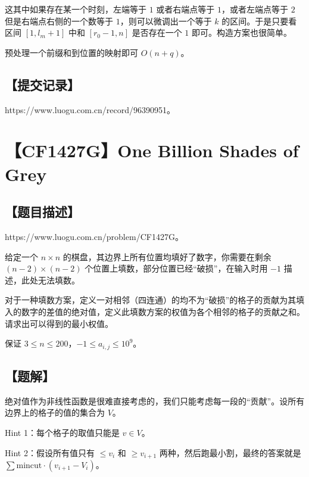 \documentclass[UTF8,12pt,a4paper]{ctexart}
\begin{document}
	这其中如果存在某一个时刻，左端等于 $1$ 或者右端点等于 $1$，或者左端点等于 $2$ 但是右端点右侧的一个数等于 $1$，则可以微调出一个等于 $k$ 的区间。于是只要看区间 $[1,l_m+1]$ 中和 $[r_0-1,n]$ 是否存在一个 $1$ 即可。构造方案也很简单。
	
	预处理一个前缀和到位置的映射即可 $O(n+q)$。
	
	\subsection*{【提交记录】}
	
	https://www.luogu.com.cn/record/96390951。
	
	
	\section*{【CF1427G】One Billion Shades of Grey}
	
	\subsection*{【题目描述】}
	
	https://www.luogu.com.cn/problem/CF1427G。
	
	给定一个 $n \times n$ 的棋盘，其边界上所有位置均填好了数字，你需要在剩余 $(n - 2) \times (n - 2)$ 个位置上填数，部分位置已经“破损”，在输入时用 $-1$ 描述，此处无法填数。
	
	对于一种填数方案，定义一对相邻（四连通）的均不为“破损”的格子的贡献为其填入的数字的差值的绝对值，定义此填数方案的权值为各个相邻的格子的贡献之和。请求出可以得到的最小权值。
	
	保证 $3 \le n \le 200$，$-1 \le a_{i, j} \le {10}^9$。
	
	\subsection*{【题解】}
	
	绝对值作为非线性函数是很难直接考虑的，我们只能考虑每一段的“贡献”。设所有边界上的格子的值的集合为 $V$。
	
	Hint 1：每个格子的取值只能是 $v\in V$。
	
	Hint 2：假设所有值只有 $\le v_i$ 和 $\ge v_{i+1}$ 两种，然后跑最小割，最终的答案就是 $\sum\mathrm{mincut}\cdot (v_{i+1}-V_i)$。
	
\end{document}
